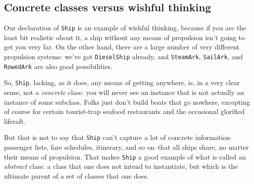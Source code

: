 
\subsection{Concrete classes versus wishful thinking}
Our declaration of {\tt Ship} is an example of wishful thinking, because
if you are the least bit realistic about it, a ship without any means of
propulsion isn't going to get you very far.  On the other hand, there
are a large number of very different propulsion systems:  we've got {\tt DieselShip}
already, and {\tt SteamArk}, {\tt SailArk}, and {\tt RowedArk} are also good possibilities.

So, {\tt Ship}, lacking, as it does, any means of getting anywhere, is, in a
very clear sense, not a {\em concrete} class: you will never see an instance
that is not actually an instance of some subclass. Folks just don't build
boats that go nowhere, excepting of course for certain tourist-trap seafood
restaurants and the occasional glorified liferaft.

But that is not to say that {\tt Ship} can't capture a lot of concrete 
information--passenger lists, fare schedules, itinerary, and so on--that
all ships share, no matter their means of propulsion.  That makes {\tt Ship} a
good example of what is  
called an {\em abstract} class: a class that one does not intend to
instantiate, but 
which is the ultimate parent of a set of classes that one does.


